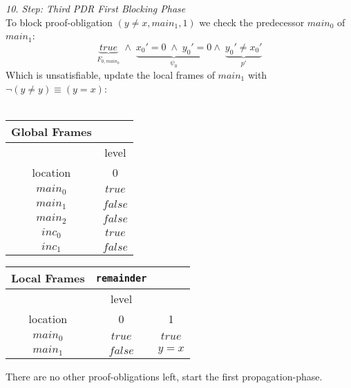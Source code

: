 \documentclass{article}
\begin{document}
	\textsl{10. Step: Third PDR First Blocking Phase} \\
		To block proof-obligation $(y \neq x, main_1, 1)$ we check the predecessor $main_0$ of $main_1$: \\
	\begin{equation*}
	\underbrace{true}_{F_{0, main_0}}\; \land \; \underbrace{x_0' = 0 \; \land \; y_0' = 0}_{\psi_0} \land \; \underbrace{y_0' \neq x_0'}_{p'}
	\end{equation*}
	Which is unsatisfiable, update the local frames of $main_1$ with $\neg(y \neq y) \equiv (y = x)$: \\ \\ 
	\begin{minipage}{.5\textwidth}
		\setlength\tabcolsep{0.35em}
		\begin{center}
			\begin{tabu}{cc}
				Global Frames \\
				\toprule
				& level \\
				\cmidrule(lr){2-2}
				location & 0 \\
				$main_0$ & $true$ \\
				$main_1$ & $false$ \\
				$main_2$ & $false$ \\
				$inc_0$ & $true$ \\
				$inc_1$ & $false$\\
				\bottomrule
			\end{tabu}
		\end{center}
	\end{minipage}
	\hfill
	\begin{minipage}{.4\textwidth}
		\setlength\tabcolsep{0.35em}
		\begin{center}
			\begin{tabu}{ccc}
				Local Frames & \texttt{remainder}\\
				\toprule
				& level \\
				\cmidrule(lr){2-3}
				location & 0 & 1 \\
				\cmidrule{1-3}
				$main_0$ & $true$ & $true$ \\
				$main_1$ & $false$ & $y = x$\\
				\bottomrule
			\end{tabu}
		\end{center}	
	\end{minipage}
	
	\vspace*{2em}
	
	There are no other proof-obligations left, start the first propagation-phase. \\ \\
	
\end{document}

